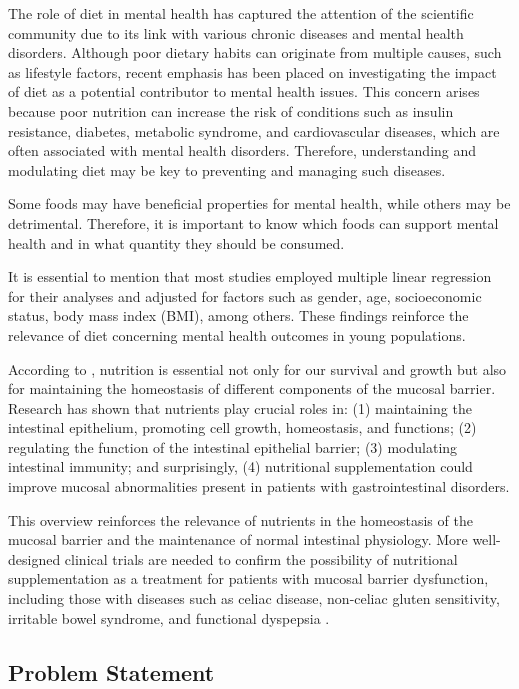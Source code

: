 \documentclass[jou]{apa7}
\begin{document}
The role of diet in mental health has captured the attention of the scientific community due to its link with various chronic diseases and mental health disorders. Although poor dietary habits can originate from multiple causes, such as lifestyle factors, recent emphasis has been placed on investigating the impact of diet as a potential contributor to mental health issues. This concern arises because poor nutrition can increase the risk of conditions such as insulin resistance, diabetes, metabolic syndrome, and cardiovascular diseases, which are often associated with mental health disorders. Therefore, understanding and modulating diet may be key to preventing and managing such diseases.

Some foods may have beneficial properties for mental health, while others may be detrimental. Therefore, it is important to know which foods can support mental health and in what quantity they should be consumed.

It is essential to mention that most studies employed multiple linear regression for their analyses and adjusted for factors such as gender, age, socioeconomic status, body mass index (BMI), among others. These findings reinforce the relevance of diet concerning mental health outcomes in young populations.

According to \parencite{Farre2020}, nutrition is essential not only for our survival and growth but also for maintaining the homeostasis of different components of the mucosal barrier. Research has shown that nutrients play crucial roles in: (1) maintaining the intestinal epithelium, promoting cell growth, homeostasis, and functions; (2) regulating the function of the intestinal epithelial barrier; (3) modulating intestinal immunity; and surprisingly, (4) nutritional supplementation could improve mucosal abnormalities present in patients with gastrointestinal disorders.

This overview reinforces the relevance of nutrients in the homeostasis of the mucosal barrier and the maintenance of normal intestinal physiology. More well-designed clinical trials are needed to confirm the possibility of nutritional supplementation as a treatment for patients with mucosal barrier dysfunction, including those with diseases such as celiac disease, non-celiac gluten sensitivity, irritable bowel syndrome, and functional dyspepsia \parencite{Farre2020}.






\subsection{Problem Statement}
\end{document}
